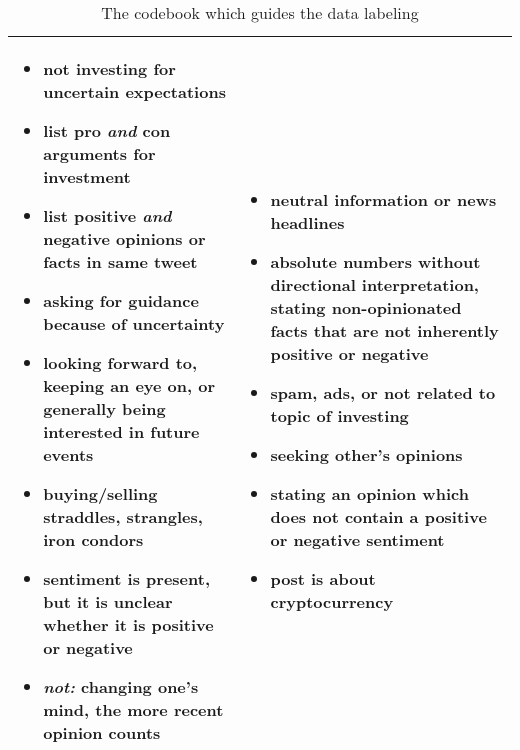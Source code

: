 \begin{table}[!ht]
\begin{tabular}{p{7.5cm}p{7.5cm}}
\begin{itemize}[noitemsep,leftmargin=*,topsep=-12pt]
	\item not investing for uncertain expectations
	\item list pro \emph{and} con arguments for investment
	\item list positive \emph{and} negative opinions or facts in same tweet
	\item asking for guidance because of uncertainty
	\item looking forward to, keeping an eye on, or generally being interested in future events
	\item buying/selling straddles, strangles, iron condors
	\item sentiment is present, but it is unclear whether it is positive or negative
	\item \emph{not:} changing one's mind, the more recent opinion counts

\end{itemize} & \begin{itemize}[noitemsep,leftmargin=*,topsep=-12pt]
	\item neutral information or news headlines
	\item absolute numbers without directional interpretation, stating non-opinionated facts that are not inherently positive or negative
	\item spam, ads, or not related to topic of investing
	\item seeking other's opinions
	\item stating an opinion which does not contain a positive or negative sentiment
	\item post is about cryptocurrency
\end{itemize}\\

\bottomrule
\end{tabular}
\caption{The codebook which guides the data labeling}
\label{table-codebook}
\end{table}